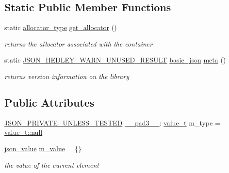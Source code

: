 \subsection*{Static Public Member Functions}
\begin{DoxyCompactItemize}
\item 
static \hyperlink{classnlohmann_1_1basic__json_ad38ae80f1e99d4b1f33c99fea4611457}{allocator\+\_\+type} \hyperlink{classnlohmann_1_1basic__json_afc55e7dca1a243b0d5011564824c0267}{get\+\_\+allocator} ()
\begin{DoxyCompactList}\small\item\em returns the allocator associated with the container \end{DoxyCompactList}\item 
static \hyperlink{json_8hpp_a28d7e3b2d26bd5b8a3806da3db7dea03}{J\+S\+O\+N\+\_\+\+H\+E\+D\+L\+E\+Y\+\_\+\+W\+A\+R\+N\+\_\+\+U\+N\+U\+S\+E\+D\+\_\+\+R\+E\+S\+U\+LT} \hyperlink{classnlohmann_1_1basic__json}{basic\+\_\+json} \hyperlink{classnlohmann_1_1basic__json_a351b4f65014f6c2b8b2832847d44bbd7}{meta} ()
\begin{DoxyCompactList}\small\item\em returns version information on the library \end{DoxyCompactList}\end{DoxyCompactItemize}
\subsection*{Public Attributes}
\begin{DoxyCompactItemize}
\item 
\hyperlink{json_8hpp_a2cf645f34610e7f7d6e09ab88a2ab917}{J\+S\+O\+N\+\_\+\+P\+R\+I\+V\+A\+T\+E\+\_\+\+U\+N\+L\+E\+S\+S\+\_\+\+T\+E\+S\+T\+ED} \hyperlink{classnlohmann_1_1basic__json_aa52fb28bbfe1d5484808cad53c35d76c}{\+\_\+\+\_\+pad3\+\_\+\+\_\+}\+: \hyperlink{namespacenlohmann_1_1detail_a1ed8fc6239da25abcaf681d30ace4985}{value\+\_\+t} m\+\_\+type = \hyperlink{namespacenlohmann_1_1detail_a1ed8fc6239da25abcaf681d30ace4985a37a6259cc0c1dae299a7866489dff0bd}{value\+\_\+t\+::null}
\item 
\hyperlink{classnlohmann_1_1basic__json_abcfe744b08e2cd81508ce9bf7ebc86cf}{json\+\_\+value} \hyperlink{classnlohmann_1_1basic__json_a72f1c0ede41f166429ce3fe7c2ffefc0}{m\+\_\+value} = \{\}
\begin{DoxyCompactList}\small\item\em the value of the current element \end{DoxyCompactList}\end{DoxyCompactItemize}

